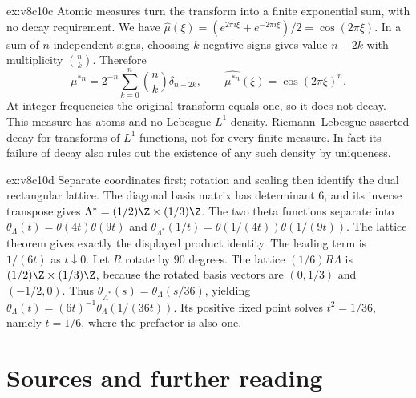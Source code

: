 \begin{solution}{ex:v8c10c}
\idea Atomic measures turn the transform into a finite exponential sum, with no decay requirement.
\writeup We have $\hat\mu(\xi)=(e^{2\pi i\xi}+e^{-2\pi i\xi})/2=\cos(2\pi\xi)$. In a sum of $n$ independent signs, choosing $k$ negative signs gives value $n-2k$ with multiplicity $\binom nk$. Therefore
\[
\mu^{*n}=2^{-n}\sum_{k=0}^n\binom nk\delta_{n-2k},\qquad
\widehat{\mu^{*n}}(\xi)=\cos(2\pi\xi)^n.
\]
At integer frequencies the original transform equals one, so it does not decay. This measure has atoms and no Lebesgue $L^1$ density. Riemann--Lebesgue asserted decay for transforms of $L^1$ functions, not for every finite measure. In fact its failure of decay also rules out the existence of any such density by uniqueness.
\end{solution}

\begin{solution}{ex:v8c10d}
\idea Separate coordinates first; rotation and scaling then identify the dual rectangular lattice.
\writeup The diagonal basis matrix has determinant $6$, and its inverse transpose gives $\Lambda^*=(1/2)\Z\times(1/3)\Z$. The two theta functions separate into $\theta_\Lambda(t)=\theta(4t)\theta(9t)$ and $\theta_{\Lambda^*}(1/t)=\theta(1/(4t))\theta(1/(9t))$. The lattice theorem gives exactly the displayed product identity. The leading term is $1/(6t)$ as $t\downarrow0$.
Let $R$ rotate by $90$ degrees. The lattice $(1/6)R\Lambda$ is $(1/2)\Z\times(1/3)\Z$, because the rotated basis vectors are $(0,1/3)$ and $(-1/2,0)$. Thus $\theta_{\Lambda^*}(s)=\theta_\Lambda(s/36)$, yielding $\theta_\Lambda(t)=(6t)^{-1}\theta_\Lambda(1/(36t))$. Its positive fixed point solves $t^2=1/36$, namely $t=1/6$, where the prefactor is also one.
\end{solution}

\section*{Sources and further reading}


